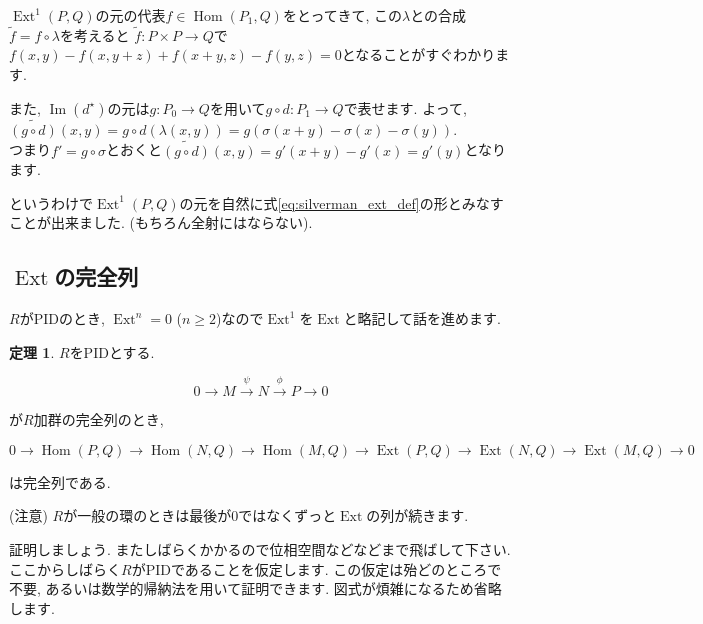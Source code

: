 \documentclass{jsarticle}
\newcommand{\makeop}[1]{\mathop{\mathrm{#1}}\nolimits}
\def\Im{\makeop{Im}}
\def\Hom{\makeop{Hom}}
\def\Ext{\makeop{Ext}}
\theoremstyle{definition}
\newtheorem{theorem}{定理}
\numberwithin{theorem}{section}
\begin{document}
$\Ext^1(P, Q)$の元の代表$f\in\Hom(P_1, Q)$をとってきて, この$\lambda$との合成$\tilde{f} = f\circ\lambda$を考えると
$\tilde{f} : P \times P \rightarrow Q$で$f(x, y) - f(x, y+z) + f(x+y, z) - f(y, z) = 0$となることがすぐわかります.

また, $\Im(d^\star)$の元は$g: P_0 \rightarrow Q$を用いて$g\circ d: P_1 \rightarrow Q$で表せます. よって,
$\tilde{(g\circ d)} (x, y) = g\circ d(\lambda(x, y)) = g(\sigma(x+y) - \sigma(x) - \sigma(y))$.\\
つまり$f' = g\circ\sigma$とおくと$\tilde{(g\circ d)}(x, y) = g'(x+y) - g'(x) = g'(y)$となります. 

というわけで$\Ext^1(P, Q)$の元を自然に式\ref{eq:silverman_ext_def}の形とみなすことが出来ました. (もちろん全射にはならない).

\subsection{$\Ext$の完全列}
$R$がPIDのとき, $\Ext^n = 0$ ($n \geq 2$)なので$\Ext^1$を$\Ext$と略記して話を進めます.

\begin{theorem}
$R$をPIDとする.

\begin{equation*}
0 \rightarrow M \xrightarrow{\psi} N \xrightarrow{\phi} P \rightarrow 0
\end{equation*}

が$R$加群の完全列のとき, 

\begin{equation*}
0 \rightarrow \Hom(P, Q) \rightarrow \Hom(N, Q) \rightarrow \Hom(M, Q) \rightarrow
\Ext(P, Q) \rightarrow \Ext(N, Q) \rightarrow \Ext(M, Q) \rightarrow 0
\end{equation*}

は完全列である.
\end{theorem}

(注意) $R$が一般の環のときは最後が$0$ではなくずっと$\Ext$の列が続きます.

証明しましょう. またしばらくかかるので位相空間などなどまで飛ばして下さい. ここからしばらく$R$がPIDであることを仮定します.
この仮定は殆どのところで不要, あるいは数学的帰納法を用いて証明できます. 図式が煩雑になるため省略します.
\end{document}
